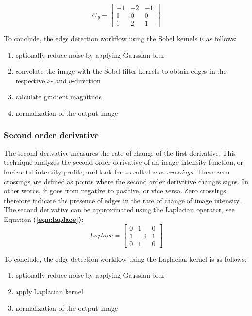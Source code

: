 \begin{equation}\label{eqn:gy}
	G_{y} =
	\begin{bmatrix}
		-1 & -2 & -1 \\
		0  & 0  & 0  \\
		1  & 2  & 1
	\end{bmatrix}
\end{equation}

\noindent
To conclude, the edge detection workflow using the Sobel kernels is as follows:
\begin{enumerate}
	\item optionally reduce noise by applying Gaussian blur
	\item convolute the image with the Sobel filter kernels to obtain edges in the respective $x$- and $y$-direction
	\item calculate gradient magnitude %
	\item normalization of the output image
\end{enumerate}

\subsubsection*{Second order derivative}
The second derivative measures the rate of change of the first derivative.
This technique analyzes the second order derivative of an image intensity function, or horizontal intensity profile,
and look for so-called \textit{zero crossings}.
These zero crossings are defined as points where the second order derivative changes signs.
In other words, it goes from negative to positive, or vice versa.
Zero crossings therefore indicate the presence of edges in the rate of change of image intensity \cite{gonzalezDigitalImageProcessing2007}.
The second derivative can be approximated using the Laplacian operator, see Equation \textbf{(\ref{eqn:laplace})}:
\begin{equation}\label{eqn:laplace}
	Laplace =
	\begin{bmatrix}
		0 & 1  & 0 \\
		1 & -4 & 1 \\
		0 & 1  & 0
	\end{bmatrix}
\end{equation}

\noindent
To conclude, the edge detection workflow using the Laplacian kernel is as follows:
\begin{enumerate}
	\item optionally reduce noise by applying Gaussian blur
	\item apply Laplacian kernel
	\item normalization of the output image
\end{enumerate}

